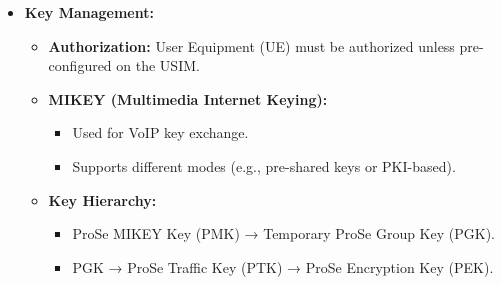 \begin{itemize}
    \item \textbf{Key Management:}
    \begin{itemize}
        \item \textbf{Authorization:} User Equipment (UE) must be authorized unless pre-configured on the USIM.
        \item \textbf{MIKEY (Multimedia Internet Keying):}
        \begin{itemize}
            \item Used for VoIP key exchange.
            \item Supports different modes (e.g., pre-shared keys or PKI-based).
        \end{itemize}
        \item \textbf{Key Hierarchy:}
        \begin{itemize}
            \item ProSe MIKEY Key (PMK) → Temporary ProSe Group Key (PGK).
            \item PGK → ProSe Traffic Key (PTK) → ProSe Encryption Key (PEK).
        \end{itemize}
    \end{itemize}
\end{itemize}

